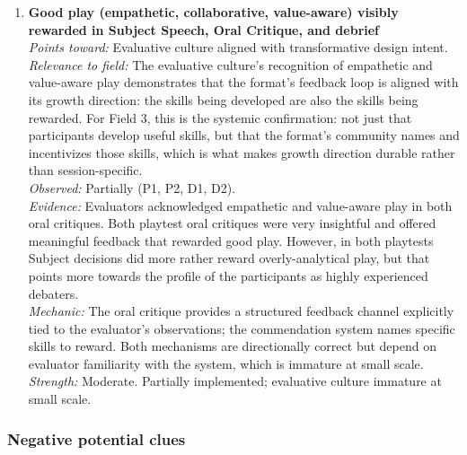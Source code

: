 \documentclass[12pt]{article}
\begin{document}
\begin{enumerate}
\item \textbf{Good play (empathetic, collaborative, value-aware) visibly rewarded in Subject Speech, Oral Critique, and debrief}\\
\textit{Points toward:} Evaluative culture aligned with transformative design intent.\\
\textit{Relevance to field:} The evaluative culture's recognition of empathetic and value-aware play demonstrates that the format's feedback loop is aligned with its growth direction: the skills being developed are also the skills being rewarded. For Field 3, this is the systemic confirmation: not just that participants develop useful skills, but that the format's community names and incentivizes those skills, which is what makes growth direction durable rather than session-specific.\\
\textit{Observed:} Partially (P1, P2, D1, D2).\\
\textit{Evidence:} Evaluators acknowledged empathetic and value-aware play in both oral critiques. Both playtest oral critiques were very insightful and offered meaningful feedback that rewarded good play. However, in both playtests Subject decisions did more rather reward overly-analytical play, but that points more towards the profile of the participants as highly experienced debaters.\\
\textit{Mechanic:} The oral critique provides a structured feedback channel explicitly tied to the evaluator's observations; the commendation system names specific skills to reward. Both mechanisms are directionally correct but depend on evaluator familiarity with the system, which is immature at small scale.\\
\textit{Strength:} Moderate. Partially implemented; evaluative culture immature at small scale.

\end{enumerate}

\subsubsection*{Negative potential clues}
\end{document}
